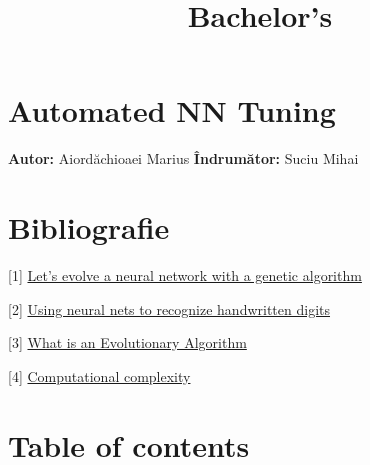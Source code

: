 \documentclass[11pt]{article}
\title{Bachelor's}
\begin{document}
    
    
    \maketitle
    
    

    
    \hypertarget{automated-nn-tuning}{%
\section{Automated NN Tuning}\label{automated-nn-tuning}}

\textbf{Autor: }Aiordăchioaei Marius \textbar{} \textbf{Îndrumător:
}Suciu Mihai

    \hypertarget{bibliografie}{%
\section{Bibliografie}\label{bibliografie}}

{[}1{]}
\href{https://blog.coast.ai/lets-evolve-a-neural-network-with-a-genetic-algorithm-code-included-8809bece164}{Let's
evolve a neural network with a genetic algorithm}

{[}2{]} \href{http://neuralnetworksanddeeplearning.com/chap1.html}{Using
neural nets to recognize handwritten digits}

{[}3{]}
\href{https://www.cs.vu.nl/~gusz/ecbook/Eiben-Smith-Intro2EC-Ch2.pdf}{What
is an Evolutionary Algorithm}

{[}4{]}
\href{https://en.wikipedia.org/wiki/Computational_complexity}{Computational
complexity}

    \hypertarget{table-of-contents}{%
\section{Table of contents}\label{table-of-contents}}
\end{document}
